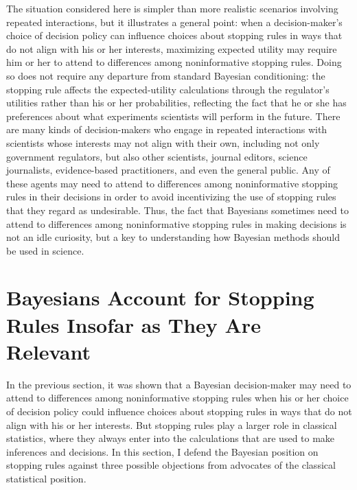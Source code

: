 \documentclass{article}
\theoremstyle{definition}
\begin{document}
The situation considered here is simpler than more realistic scenarios involving repeated interactions, but it illustrates a general point: when a decision-maker's choice of decision policy can influence choices about stopping rules in ways that do not align with his or her interests, maximizing expected utility may require him or her to attend to differences among noninformative stopping rules.
Doing so does not require any departure from standard Bayesian conditioning: the stopping rule affects the expected-utility calculations through the regulator's utilities rather than his or her probabilities, reflecting the fact that he or she has preferences about what experiments scientists will perform in the future.
There are many kinds of decision-makers who engage in repeated interactions with scientists whose interests may not align with their own, including not only government regulators, but also other scientists, journal editors, science journalists, evidence-based practitioners, and even the general public.
Any of these agents may need to attend to differences among noninformative stopping rules in their decisions in order to avoid incentivizing the use of stopping rules that they regard as undesirable.
Thus, the fact that Bayesians sometimes need to attend to differences among noninformative stopping rules in making decisions is not an idle curiosity, but a key to understanding how Bayesian methods should be used in science.

\section{Bayesians Account for Stopping Rules Insofar as They Are Relevant}\label{sec:success}

In the previous section, it was shown that a Bayesian decision-maker may need to attend to differences among noninformative stopping rules when his or her choice of decision policy could influence choices about stopping rules in ways that do not align with his or her interests.
But stopping rules play a larger role in classical statistics, where they always enter into the calculations that are used to make inferences and decisions.
In this section, I defend the Bayesian position on stopping rules against three possible objections from advocates of the classical statistical position.
\end{document}

